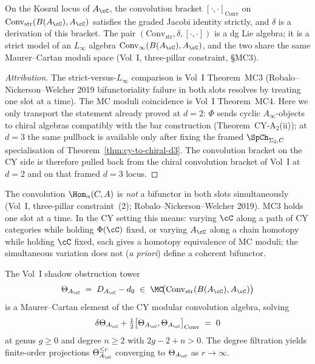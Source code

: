 \begin{proposition}
\label{prop:cy-conv-dglie}
On the Koszul locus of $A_\cC$, the convolution bracket $[\cdot, \cdot]_{\mathrm{Conv}}$ on $\mathrm{Conv}_{\mathrm{str}}(B(A_\cC), A_\cC)$ satisfies the graded Jacobi identity strictly, and $\delta$ is a derivation of this bracket. The pair $(\mathrm{Conv}_{\mathrm{str}}, \delta, [\cdot, \cdot])$ is a dg Lie algebra; it is a strict model of an $L_\infty$ algebra $\mathrm{Conv}_{\infty}(B(A_\cC), A_\cC)$, and the two share the same Maurer--Cartan moduli space (Vol~I, three-pillar constraint, \S MC3).
\end{proposition}

\begin{proof}[Attribution]
The strict-versus-$L_\infty$ comparison is Vol~I Theorem~MC3 (Robalo--Nick\-erson--Welch\-er 2019 bifunctoriality failure in both slots resolves by treating one slot at a time). The MC moduli coincidence is Vol~I Theorem~MC4. Here we only transport the statement already proved at $d = 2$: $\Phi$ sends cyclic $A_\infty$-objects to chiral algebras compatibly with the bar construction (Theorem~CY-A$_2$(ii)); at $d = 3$ the same pullback is available only after fixing the framed $\SpCh_{\Sigma_2,C}$ specialisation of Theorem~\ref{thm:cy-to-chiral-d3}. The convolution bracket on the CY side is therefore pulled back from the chiral convolution bracket of Vol~I at $d = 2$ and on that framed $d = 3$ locus.
\end{proof}

\begin{remark}
\label{rem:conv-bifunctor-warning}
The convolution $\Hom_\alpha(C, A)$ is \emph{not} a bifunctor in both slots simultaneously (Vol~I, three-pillar constraint~(2); Robalo--Nickerson--Welcher 2019). MC3 holds one slot at a time. In the CY setting this means: varying $\cC$ along a path of CY categories while holding $\Phi(\cC)$ fixed, or varying $A_\cC$ along a chain homotopy while holding $\cC$ fixed, each gives a homotopy equivalence of MC moduli; the simultaneous variation does not (\emph{a priori}) define a coherent bifunctor.
\end{remark}

\begin{theorem}
\label{thm:cy-theta-mc}
The Vol~I shadow obstruction tower
\[
 \Theta_{A_\cC} \;=\; D_{A_\cC} - d_0 \;\in\; \MC\!\bigl(\mathrm{Conv}_{\mathrm{str}}(B(A_\cC), A_\cC)\bigr)
\]
is a Maurer--Cartan element of the CY modular convolution algebra, solving
\[
 \delta \Theta_{A_\cC} + \tfrac{1}{2}\bigl[\Theta_{A_\cC}, \Theta_{A_\cC}\bigr]_{\mathrm{Conv}} \;=\; 0
\]
at genus $g \geq 0$ and degree $n \geq 2$ with $2g - 2 + n > 0$. The degree filtration yields finite-order projections $\Theta_{A_\cC}^{\leq r}$ converging to $\Theta_{A_\cC}$ as $r \to \infty$.
\end{theorem}


